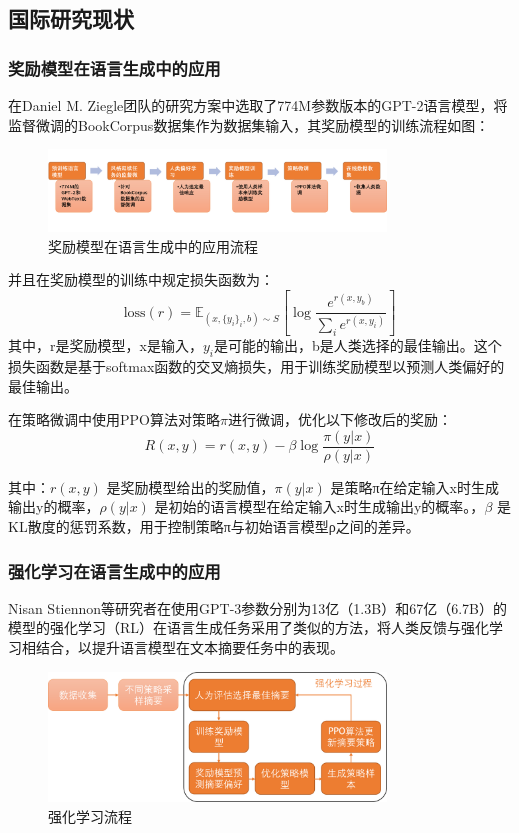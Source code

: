 \subsection{国际研究现状}
\subsubsection{奖励模型在语言生成中的应用}
在Daniel M. Ziegle团队的研究方案中\cite{Ziegler2019FineTuningLM}选取了774M参数版本的GPT-2语言模型，将监督微调的BookCorpus数据集作为数据集输入，其奖励模型的训练流程如图：
\begin{figure}[htbp]
    \centering
    \includegraphics[width=0.8\textwidth]{./img/board1.png}
    \caption{奖励模型在语言生成中的应用流程}\label{fig:RM}
\end{figure}

并且在奖励模型的训练中规定损失函数为：
\[
    \text{loss}(r) = \mathbb{E}_{(x,\{y_i\}_i,b) \sim S} \left[ \log \frac{e^{r(x,y_b)}}{\sum_i e^{r(x,y_i)}} \right]
\]
其中，r是奖励模型，x是输入，$y_i$​是可能的输出，b是人类选择的最佳输出。这个损失函数是基于softmax函数的交叉熵损失，用于训练奖励模型以预测人类偏好的最佳输出。

在策略微调中使用PPO算法对策略$\pi$进行微调，优化以下修改后的奖励：
\[
    R(x, y) = r(x, y) - \beta \log \frac{\pi(y|x)}{\rho(y|x)}
\]

其中：\( r(x, y) \) 是奖励模型给出的奖励值，\( \pi(y|x) \) 是策略π在给定输入x时生成输出y的概率，\( \rho(y|x) \) 是初始的语言模型在给定输入x时生成输出y的概率。，\( \beta \) 是KL散度的惩罚系数，用于控制策略π与初始语言模型ρ之间的差异。
\subsubsection{强化学习在语言生成中的应用}
Nisan
Stiennon等研究者在使用GPT-3参数分别为13亿（1.3B）和67亿（6.7B）的模型的强化学习（RL）在语言生成任务采用了类似的方法\cite{10.5555/3495724.3495977}，将人类反馈与强化学习相结合，以提升语言模型在文本摘要任务中的表现。
\begin{figure}[htbp]
    \centering
    \includegraphics[width=0.8\textwidth]{./img/rl1.png}
    \caption{强化学习流程}\label{fig:RL}
\end{figure}

